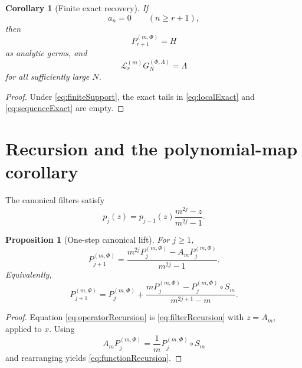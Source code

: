 \documentclass[11pt]{article}
\newtheorem{proposition}[theorem]{Proposition}
\newtheorem{corollary}[theorem]{Corollary}
\theoremstyle{remark}
\newcommand{\Lop}{\mathcal L}
\begin{document}
\begin{corollary}[Finite exact recovery]
\label{cor:exact}
If
\begin{equation}
a_n=0
\qquad(n\ge r+1),
\label{eq:finiteSupport}
\end{equation}
then
\begin{equation}
\boxed{
P_{r+1}^{(m,\Phi)}=H
}
\label{eq:exactLocal}
\end{equation}
as analytic germs, and
\begin{equation}
\boxed{
\Lop_r^{(m)}G_N^{(\Phi,\Lambda)}=\Lambda
}
\label{eq:exactSequence}
\end{equation}
for all sufficiently large \(N\).
\end{corollary}

\begin{proof}
Under \eqref{eq:finiteSupport}, the exact tails in
\eqref{eq:localExact} and \eqref{eq:sequenceExact} are empty.
\end{proof}

\section{Recursion and the polynomial-map corollary}

The canonical filters satisfy
\begin{equation}
p_j(z)
=
p_{j-1}(z)
\frac{m^{2j}-z}{m^{2j}-1}.
\label{eq:filterRecursion}
\end{equation}

\begin{proposition}[One-step canonical lift]
\label{prop:recursion}
For \(j\ge1\),
\begin{equation}
\boxed{
P_{j+1}^{(m,\Phi)}
=
\frac{m^{2j}P_j^{(m,\Phi)}-A_mP_j^{(m,\Phi)}}{m^{2j}-1}.
}
\label{eq:operatorRecursion}
\end{equation}
Equivalently,
\begin{equation}
\boxed{
P_{j+1}^{(m,\Phi)}
=
P_j^{(m,\Phi)}
+
\frac{mP_j^{(m,\Phi)}-P_j^{(m,\Phi)}\circ S_m}
{m^{2j+1}-m}.
}
\label{eq:functionRecursion}
\end{equation}
\end{proposition}

\begin{proof}
Equation \eqref{eq:operatorRecursion} is
\eqref{eq:filterRecursion} with \(z=A_m\), applied to \(x\).
Using
\[
A_mP_j^{(m,\Phi)}
=
\frac1m P_j^{(m,\Phi)}\circ S_m
\]
and rearranging yields \eqref{eq:functionRecursion}.
\end{proof}
\end{document}

